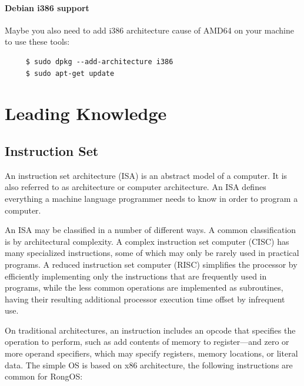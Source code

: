 \documentclass{swfcthesis}
\begin{document}
\subsubsection{Debian i386 support}
\label{sec:debian-i386-support}

Maybe you also need to add i386 architecture cause of AMD64 on your machine to use these
tools:

\begin{verbatim}
     $ sudo dpkg --add-architecture i386
     $ sudo apt-get update
\end{verbatim}

\chapter{Leading Knowledge}
\label{cha:leading-knowledge}

\section{Instruction Set}
\label{sec:instruction-set}
An instruction set architecture (ISA) is an abstract model of a computer. It is also
referred to as architecture or computer architecture. An ISA defines everything a machine
language programmer needs to know in order to program a computer.

\par An ISA may be classified in a number of different ways. A common classification is by
architectural complexity. A complex instruction set computer (CISC) has many specialized
instructions, some of which may only be rarely used in practical programs. A reduced
instruction set computer (RISC) simplifies the processor by efficiently implementing only
the instructions that are frequently used in programs, while the less common operations
are implemented as subroutines, having their resulting additional processor execution time
offset by infrequent use.

\par On traditional architectures, an instruction includes an opcode that specifies the
operation to perform, such as add contents of memory to register—and zero or more operand
specifiers, which may specify registers, memory locations, or literal
data. The simple OS is based on x86 architecture, the following instructions are common
for RongOS:
\end{document}
